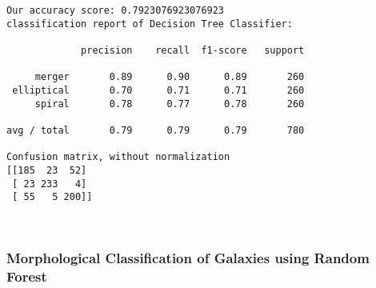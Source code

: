 \documentclass[11pt]{article}
\begin{document}
    \begin{Verbatim}[commandchars=\\\{\}]
Our accuracy score: 0.7923076923076923
classification report of Decision Tree Classifier:

             precision    recall  f1-score   support

     merger       0.89      0.90      0.89       260
 elliptical       0.70      0.71      0.71       260
     spiral       0.78      0.77      0.78       260

avg / total       0.79      0.79      0.79       780

Confusion matrix, without normalization
[[185  23  52]
 [ 23 233   4]
 [ 55   5 200]]

    \end{Verbatim}

    \begin{center}
    \end{center}
    { \hspace*{\fill} \\}
    
    \subsubsection{Morphological Classification of Galaxies using Random
Forest}\label{morphological-classification-of-galaxies-using-random-forest}
\end{document}
